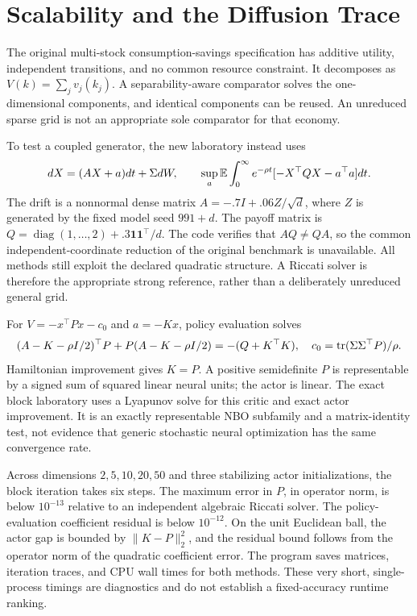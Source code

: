 \section{Scalability and the Diffusion Trace}\label{sec:scaling}
The original multi-stock consumption-savings specification has additive utility, independent transitions, and no common resource constraint. It decomposes as $V(k)=\sum_jv_j(k_j)$. A separability-aware comparator solves the one-dimensional components, and identical components can be reused. An unreduced sparse grid is not an appropriate sole comparator for that economy.

To test a coupled generator, the new laboratory instead uses
\begin{equation}\label{eq:lq}
 dX=(AX+a)dt+\Sigma dW,\qquad
 \sup_a\mathbb E\int_0^\infty e^{-\rho t}[-X^\top QX-a^\top a]dt.
\end{equation}
The drift is a nonnormal dense matrix $A=-.7I+.06Z/\sqrt d$, where $Z$ is generated by the fixed model seed $991+d$. The payoff matrix is $Q=\operatorname{diag}(1,\ldots,2)+.3\bm1\bm1^\top/d$. The code verifies that $AQ\ne QA$, so the common independent-coordinate reduction of the original benchmark is unavailable. All methods still exploit the declared quadratic structure. A Riccati solver is therefore the appropriate strong reference, rather than a deliberately unreduced general grid.

For $V=-x^\top Px-c_0$ and $a=-Kx$, policy evaluation solves
\begin{equation}\label{eq:lyapunov}
 (A-K-\rho I/2)^\top P+P(A-K-\rho I/2)=-(Q+K^\top K),
 \quad c_0=\operatorname{tr}(\Sigma\Sigma^\top P)/\rho.
\end{equation}
Hamiltonian improvement gives $K=P$. A positive semidefinite $P$ is representable by a signed sum of squared linear neural units; the actor is linear. The exact block laboratory uses a Lyapunov solve for this critic and exact actor improvement. It is an exactly representable NBO subfamily and a matrix-identity test, not evidence that generic stochastic neural optimization has the same convergence rate.

Across dimensions $2,5,10,20,50$ and three stabilizing actor initializations, the block iteration takes six steps. The maximum error in $P$, in operator norm, is below $10^{-13}$ relative to an independent algebraic Riccati solver. The policy-evaluation coefficient residual is below $10^{-12}$. On the unit Euclidean ball, the actor gap is bounded by $\|K-P\|_2^2$, and the residual bound follows from the operator norm of the quadratic coefficient error. The program saves matrices, iteration traces, and CPU wall times for both methods. These very short, single-process timings are diagnostics and do not establish a fixed-accuracy runtime ranking.

